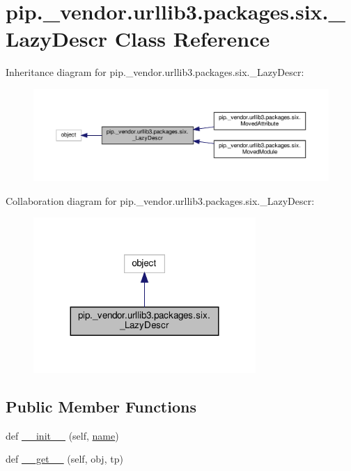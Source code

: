 \hypertarget{classpip_1_1__vendor_1_1urllib3_1_1packages_1_1six_1_1__LazyDescr}{}\section{pip.\+\_\+vendor.\+urllib3.\+packages.\+six.\+\_\+\+Lazy\+Descr Class Reference}
\label{classpip_1_1__vendor_1_1urllib3_1_1packages_1_1six_1_1__LazyDescr}


Inheritance diagram for pip.\+\_\+vendor.\+urllib3.\+packages.\+six.\+\_\+\+Lazy\+Descr\+:
\nopagebreak
\begin{figure}[H]
\begin{center}
\leavevmode
\includegraphics[width=350pt]{classpip_1_1__vendor_1_1urllib3_1_1packages_1_1six_1_1__LazyDescr__inherit__graph}
\end{center}
\end{figure}


Collaboration diagram for pip.\+\_\+vendor.\+urllib3.\+packages.\+six.\+\_\+\+Lazy\+Descr\+:
\nopagebreak
\begin{figure}[H]
\begin{center}
\leavevmode
\includegraphics[width=239pt]{classpip_1_1__vendor_1_1urllib3_1_1packages_1_1six_1_1__LazyDescr__coll__graph}
\end{center}
\end{figure}
\subsection*{Public Member Functions}
\begin{DoxyCompactItemize}
\item 
def \hyperlink{classpip_1_1__vendor_1_1urllib3_1_1packages_1_1six_1_1__LazyDescr_a353150086c3b3471d21c7a1058be2860}{\+\_\+\+\_\+init\+\_\+\+\_\+} (self, \hyperlink{classpip_1_1__vendor_1_1urllib3_1_1packages_1_1six_1_1__LazyDescr_ab59648d566d3274f298247937875a268}{name})
\item 
def \hyperlink{classpip_1_1__vendor_1_1urllib3_1_1packages_1_1six_1_1__LazyDescr_ac86ae745f6ea2d43cd2d495210a4f733}{\+\_\+\+\_\+get\+\_\+\+\_\+} (self, obj, tp)
\end{DoxyCompactItemize}

